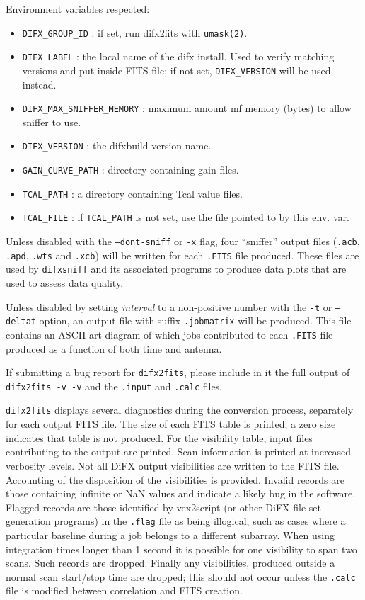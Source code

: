 \noindent Environment variables respected:
\begin{itemize}
\item {\tt DIFX\_GROUP\_ID} : if set, run difx2fits with {\tt umask(2)}.
\item {\tt DIFX\_LABEL} : the local name of the difx install.  Used to verify matching versions and put inside FITS file; if not set, {\tt DIFX\_VERSION} will be used instead.
\item {\tt DIFX\_MAX\_SNIFFER\_MEMORY} : maximum amount mf memory (bytes) to allow sniffer to use.
\item {\tt DIFX\_VERSION} : the difxbuild version name.
\item {\tt GAIN\_CURVE\_PATH} : directory containing gain files.
\item {\tt TCAL\_PATH} : a directory containing Tcal value files.
\item {\tt TCAL\_FILE} : if {\tt TCAL\_PATH} is not set, use the file pointed to by this env. var.
\end{itemize}

Unless disabled with the {\tt --dont-sniff} or {\tt -x} flag, four ``sniffer'' output files ({\tt .acb}, {\tt .apd}, {\tt .wts} and {\tt .xcb}) will be written for each {\tt .FITS} file produced.  
These files are used by {\tt difxsniff} and its associated programs to produce data plots that are used to assess data quality.

Unless disabled by setting {\em interval} to a non-positive number with the {\tt -t} or {\tt --deltat} option, an output file with suffix {\tt .jobmatrix} will be produced. 
This file contains an ASCII art diagram of which jobs contributed to each {\tt .FITS} file produced as a function of both time and antenna.

If submitting a bug report for {\tt difx2fits}, please include in it the full output of {\tt difx2fits -v -v} and the {\tt .input} and {\tt .calc} files.

{\tt difx2fits} displays several diagnostics during the conversion process, separately for each output FITS file.
The size of each FITS table is printed; a zero size indicates that table is not produced.
For the visibility table, input files contributing to the output are printed.
Scan information is printed at increased verbosity levels.
Not all DiFX output visibilities are written to the FITS file.
Accounting of the disposition of the visibilities is provided.
Invalid records are those containing infinite or NaN values and indicate a likely bug in the software.
Flagged records are those identified by vex2script (or other DiFX file set generation programs) in the {\tt .flag} file as being illogical, such as cases where a particular baseline during a job belongs to a different subarray.
When using integration times longer than 1 second it is possible for one visibility to span two scans.  
Such records are dropped.
Finally any visibilities, produced outside a normal scan start/stop time are dropped; this should not occur unless the {\tt .calc} file is modified between correlation and FITS creation.

